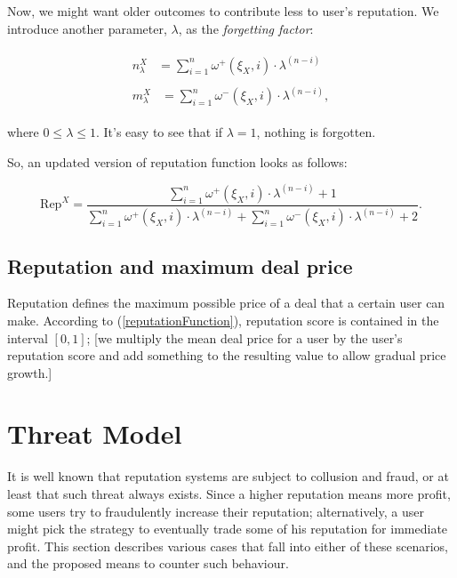 \documentclass[11pt]{article}
\begin{document}
Now, we might want older outcomes to contribute less to user's reputation. We introduce another parameter, $ \lambda $, as the \textit{forgetting factor}:

\begin{align}
\begin{split}
n_{\lambda}^{X} {}& = \sum_{i = 1}^{n} \omega^{+}(\xi_X, i) \cdot \lambda^{(n - i)}
\end{split} \\
\begin{split}
m_{\lambda}^{X} {}& = \sum_{i = 1}^{n} \omega^{-}(\xi_X, i) \cdot \lambda^{(n - i)},
\end{split}
\end{align}

where $ 0 \leq \lambda \leq 1 $. It's easy to see that if $ \lambda = 1 $, nothing is forgotten.

So, an updated version of reputation function looks as follows:

\begin{equation} \label{reputationFunction}
\text{Rep}^{X} = \frac{\sum_{i = 1}^{n} \omega^{+}(\xi_X, i) \cdot \lambda^{(n - i)} + 1}{\sum_{i = 1}^{n} \omega^{+}(\xi_X, i) \cdot \lambda^{(n - i)} + \sum_{i = 1}^{n} \omega^{-}(\xi_X, i) \cdot \lambda^{(n - i)} + 2}.
\end{equation}

\bigskip

\subsection{Reputation and maximum deal price} \label{reputation:maxDealprice}

Reputation defines the maximum possible price of a deal that a certain user can make. According to (\ref{reputationFunction}), reputation score is contained in the interval $ [0, 1] $; [we multiply the mean deal price for a user by the user's reputation score and add something to the resulting value to allow gradual price growth.]

\section{Threat Model} \label{threatModel}

It is well known \cite{ciccarelli2011collusion, maranzato2010fraud} that reputation systems are subject to collusion and fraud, or at least that such threat always exists. Since a higher reputation means more profit, some users try to fraudulently increase their reputation; alternatively, a user might 
pick the strategy to eventually trade some of his reputation for immediate profit. This section describes various cases that fall into either of these scenarios, and the proposed means to counter such behaviour.
\end{document}
